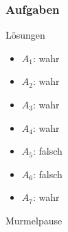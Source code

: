 \subsubsection{Aufgaben}
{
\begin{frame}{Lösungen}
  \begin{itemize}[<+- | alert@+>]
        \item 
            $A_1$: wahr
        \item
            $A_2$: wahr
        \item
            $A_3$: wahr
        \item
            $A_4$: wahr 
        \item
            $A_5$: falsch
        \item
            $A_6$: falsch
        \item
            $A_7$: wahr
    \end{itemize}
\end{frame}
}

\begin{frame}[standout]
    Murmelpause
\end{frame}





